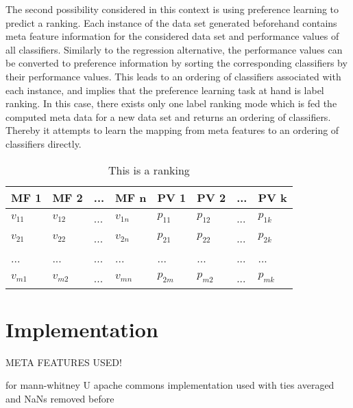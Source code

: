 The second possibility considered in this context is using preference learning to predict a ranking. Each instance of the data set generated beforehand contains meta feature information for the considered data set and performance values of all classifiers. Similarly to the regression alternative, the performance values can be converted to preference information by sorting the corresponding classifiers by their performance values. This leads to an ordering of classifiers associated with each instance, and implies that the preference learning task at hand is label ranking. In this case, there exists only one label ranking mode which is fed the computed meta data for a new data set and returns an ordering of classifiers. Thereby it attempts to learn the mapping from meta features to an ordering of classifiers directly.

\begin{table}[h]
\centering
	\begin{tabularx}{\textwidth}{X | X | X | X | X | X | X | X}
		MF 1				& MF 2				& ... 	& MF n				& PV 1 		& PV 2 		&	...	&	PV k 		\\ \hline
		$v_{11}$			& $v_{12}$			& ...	& $v_{1n}$			& $p_{11}$	& $p_{12}$	& 	...	&	$p_{1k}$		\\ \hline
		$v_{21}$			& $v_{22}$			& ...	& $v_{2n}$			& $p_{21}$	& $p_{22}$	& 	...	&	$p_{2k}$		\\ \hline
		...				& ...				& ...	& ...				& ...		& ...		&	...	&	...			\\ \hline
		$v_{m1}$			& $v_{m2}$			& ... 	& $v_{mn}$			& $p_{2m}$	& $p_{m2}$	& 	...	&	$p_{mk}$			 
	\end{tabularx}
	\label{tab:table1}
	\caption{This is a ranking}
\end{table}

\section{Implementation}

META FEATURES USED!


for mann-whitney U apache commons implementation used with ties averaged and NaNs removed before